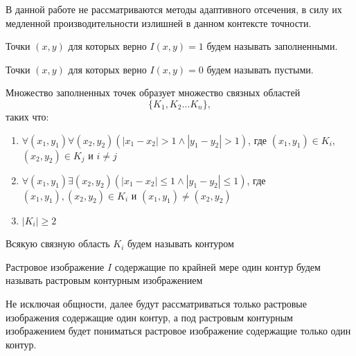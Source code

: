 \begin{remark}
В данной работе не рассматриваются методы адаптивного отсечения, в силу их медленной производительности излишней в данном контексте точности.
\end{remark}

\begin{definition}
Точки $(x,y)$ для которых верно $I(x,y) = 1$ будем называть заполненными.
\end{definition}

\begin{definition}
Точки $(x,y)$ для которых верно $I(x,y) = 0$ будем называть пустыми.
\end{definition}

Множество заполненных точек образует множество связных областей 
$$\{K_1, K_2 \dots K_n \},$$
таких что:
\begin{enumerate}
\item $\forall(x_1, y_1)\forall(x_2, y_2)(|x_1 - x_2| > 1 \wedge |y_1 - y_2|>1)$, где $(x_1, y_1)\in K_i$, $(x_2, y_2)\in K_j$ и $i\neq j$ 
\item $\forall(x_1, y_1)\exists(x_2, y_2)(|x_1 - x_2| \leq 1 \wedge |y_1 - y_2| \leq 1)$, где $(x_1, y_1),(x_2, y_2)\in K_i$ и $(x_1, y_1)\neq(x_2, y_2)$
\item $|K_i|\geq2$
\end{enumerate}

\begin{definition}
Всякую связную область $K_i$ будем называть контуром
\label{def:contour}
\end{definition}

\begin{definition}
Растровое изображение $I$ содержащие по крайней мере один контур будем называть растровым контурным изображением
\end{definition}

\begin{remark}
Не исключая общности, далее будут рассматриваться только растровые изображения содержащие один контур, а под растровым контурным изображением будет пониматься растровое изображение содержащие только один контур.
\end{remark}

